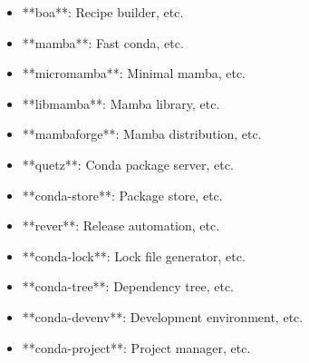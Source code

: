 \documentclass[11pt,a4paper]{article}
\begin{document}
\begin{itemize}
\item **boa**: Recipe builder, etc.
\end{itemize}

\begin{itemize}
\item **mamba**: Fast conda, etc.
\end{itemize}

\begin{itemize}
\item **micromamba**: Minimal mamba, etc.
\end{itemize}

\begin{itemize}
\item **libmamba**: Mamba library, etc.
\end{itemize}

\begin{itemize}
\item **mambaforge**: Mamba distribution, etc.
\end{itemize}

\begin{itemize}
\item **quetz**: Conda package server, etc.
\end{itemize}

\begin{itemize}
\item **conda-store**: Package store, etc.
\end{itemize}

\begin{itemize}
\item **rever**: Release automation, etc.
\end{itemize}

\begin{itemize}
\item **conda-lock**: Lock file generator, etc.
\end{itemize}

\begin{itemize}
\item **conda-tree**: Dependency tree, etc.
\end{itemize}

\begin{itemize}
\item **conda-devenv**: Development environment, etc.
\end{itemize}

\begin{itemize}
\item **conda-project**: Project manager, etc.
\end{itemize}
\end{document}
